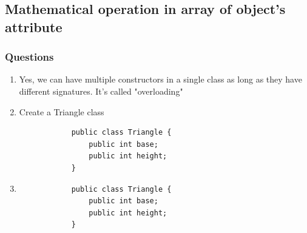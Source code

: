 \documentclass[12pt,titlepage]{article}
\begin{document}
\subsection{Mathematical operation in array of object's attribute}
\subsubsection{Questions}
\begin{enumerate}
    \item {
        Yes, we can have multiple constructors in a single class as long as they have different signatures.
        It's called "overloading"
    }
    \item {
        Create a Triangle class

        \begin{verbatim}
            public class Triangle {
                public int base;
                public int height;
            }
        \end{verbatim}
    }
    \item {
        \begin{verbatim}
            public class Triangle {
                public int base;
                public int height;
            }
        \end{verbatim}
    }
\end{enumerate}
\end{document}
